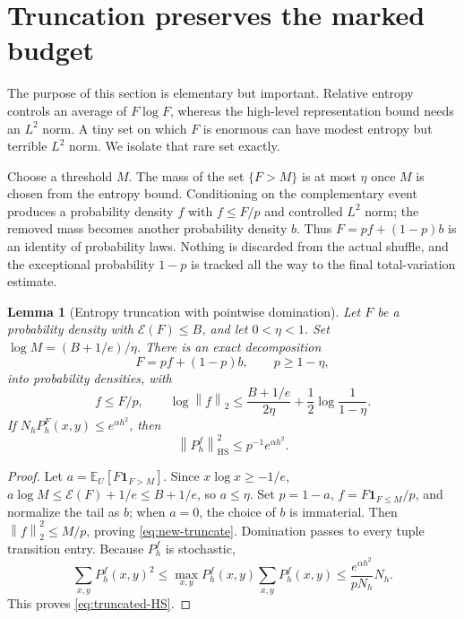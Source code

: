 \documentclass[11pt]{article}
\numberwithin{equation}{section}
\newtheorem{lemma}[theorem]{Lemma}
\theoremstyle{definition}\newtheorem{definition}[theorem]{Definition}
\theoremstyle{remark}\newtheorem{remark}[theorem]{Remark}
\newcommand{\E}{\mathbb E}
\newcommand{\Ent}{\mathcal E}
\newcommand{\ind}{\mathbf 1}
\newcommand{\HS}{\mathrm{HS}}
\newcommand{\norm}[1]{\left\lVert#1\right\rVert}
\begin{document}
\section{Truncation preserves the marked budget}
The purpose of this section is elementary but important.  Relative entropy
controls an average of $F\log F$, whereas the high-level representation bound
needs an $L^2$ norm.  A tiny set on which $F$ is enormous can have modest
entropy but terrible $L^2$ norm.  We isolate that rare set exactly.

Choose a threshold $M$.  The mass of the set $\{F>M\}$ is at most $\eta$ once
$M$ is chosen from the entropy bound.  Conditioning on the complementary event
produces a probability density $f$ with $f\le F/p$ and controlled $L^2$ norm;
the removed mass becomes another probability density $b$.  Thus
$F=pf+(1-p)b$ is an identity of probability laws.  Nothing is discarded from
the actual shuffle, and the exceptional probability $1-p$ is tracked all the
way to the final total-variation estimate.

\begin{lemma}[Entropy truncation with pointwise domination]\label{lem:new-truncate}
Let $F$ be a probability density with $\Ent(F)\le B$, and let
$0<\eta<1$. Set $\log M=(B+1/e)/\eta$. There is an exact decomposition
\begin{equation}\label{eq:new-mixture}
 F=p f+(1-p)b,\qquad p\ge1-\eta,
\end{equation}
into probability densities, with
\begin{equation}\label{eq:new-truncate}
 f\le F/p,\qquad
 \log\norm f_2\le\frac{B+1/e}{2\eta}
                     +\frac12\log\frac1{1-\eta}.
\end{equation}
If $N_hP_h^F(x,y)\le e^{\alpha h^2}$, then
\begin{equation}\label{eq:truncated-HS}
 \norm{P_h^f}_\HS^2\le p^{-1}e^{\alpha h^2}.
\end{equation}
\end{lemma}
\begin{proof}
Let $a=\E_U[F\ind_{F>M}]$. Since $x\log x\ge-1/e$,
$a\log M\le\Ent(F)+1/e\le B+1/e$, so $a\le\eta$.
Set $p=1-a$, $f=F\ind_{F\le M}/p$, and normalize the tail as $b$;
when $a=0$, the choice of $b$ is immaterial. Then
$\norm f_2^2\le M/p$, proving \eqref{eq:new-truncate}.
Domination passes to every tuple transition entry. Because $P_h^f$ is
stochastic,
\[
 \sum_{x,y}P_h^f(x,y)^2
 \le\max_{x,y}P_h^f(x,y)\sum_{x,y}P_h^f(x,y)
 \le \frac{e^{\alpha h^2}}{pN_h}N_h.
\]
This proves \eqref{eq:truncated-HS}.
\end{proof}
\end{document}
